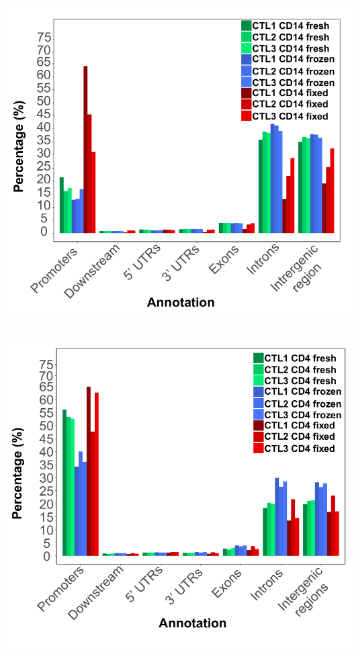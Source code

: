 \begin{figure}[htbp]
\centering
\begin{subfigure}{0.5\textwidth}
\centering
\includegraphics[width=\textwidth]{./Results1/pdfs/Core_ATAC_CD14_fresh_frozen_fixed_IDR_filtered_peak_annotation}
\caption{\textbf{}}
\end{subfigure}%
\begin{subfigure}{0.5\textwidth}
\centering
\includegraphics[width=\textwidth]{./Results1/pdfs/Core_ATAC_CD4_fresh_frozen_fixed_IDR_filtered_peak_annotation}

\end{subfigure}
\end{figure}

